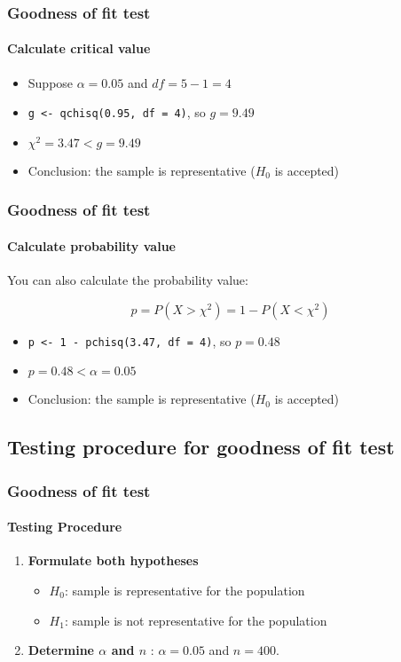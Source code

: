 \documentclass[aspectratio=169]{beamer}
\begin{document}
\begin{frame}[fragile]
  \frametitle{Goodness of fit test}
  \framesubtitle{Calculate critical value}
  
  \begin{itemize}
    \item Suppose $\alpha = 0.05$ and $df = 5 - 1 = 4$
    \item \verb|g <- qchisq(0.95, df = 4)|, so $g = 9.49$
    \item $\chi^{2} = 3.47 < g = 9.49$
    \item Conclusion: the sample is representative ($H_0$ is accepted)
  \end{itemize}
\end{frame}

\begin{frame}[fragile]
  \frametitle{Goodness of fit test}
  \framesubtitle{Calculate probability value}
  
  You can also calculate the probability value:
  
  \[ p = P(X > \chi^2) = 1 - P(X < \chi^2) \]
  
  \begin{itemize}
    \item \verb|p <- 1 - pchisq(3.47, df = 4)|, so $p = 0.48$
    \item $p = 0.48 < \alpha = 0.05$
    \item Conclusion: the sample is representative ($H_0$ is accepted)
  \end{itemize}
\end{frame}

\subsection{Testing procedure for goodness of fit test}

\begin{frame}
  \frametitle{Goodness of fit test}
  \framesubtitle{Testing Procedure}
  
  \begin{enumerate}
    \item \textbf{Formulate both hypotheses}
    \begin{itemize}
      \item $H_{0}$: sample is representative for the population
      \item $H_{1}$: sample is not representative for the population
    \end{itemize}
    \item \textbf{Determine $\alpha$ and $n$} : $\alpha = 0.05$ and $n = 400$.
  \end{enumerate}
\end{frame}
\end{document}
